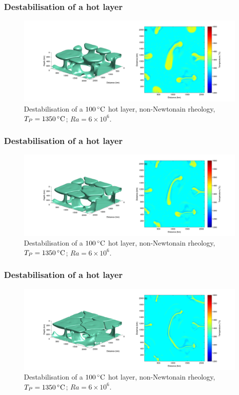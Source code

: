 \documentclass[aspectratio=169]{beamer}
\begin{document}
\begin{frame}
    \frametitle{Destabilisation of a hot layer}
    \begin{figure}
        \vspace{-.5cm}
        \includegraphics[width=0.85\paperwidth]{./figures/100hot/100hotbase_5.png}
        \caption{Destabilisation of a $100\rm\,^{\circ}C$ hot layer, non-Newtonain rheology, $T_{P}=1350\rm\,^{\circ}C$; $Ra = 6\times10^{6}$.}
    \end{figure}
\end{frame}

\begin{frame}
    \frametitle{Destabilisation of a hot layer}
    \begin{figure}
        \vspace{-.5cm}
        \includegraphics[width=0.85\paperwidth]{./figures/100hot/100hotbase_6.png}
        \caption{Destabilisation of a $100\rm\,^{\circ}C$ hot layer, non-Newtonain rheology, $T_{P}=1350\rm\,^{\circ}C$; $Ra = 6\times10^{6}$.}
    \end{figure}
\end{frame}

\begin{frame}
    \frametitle{Destabilisation of a hot layer}
    \begin{figure}
        \vspace{-.5cm}
        \includegraphics[width=0.85\paperwidth]{./figures/100hot/100hotbase_7.png}
        \caption{Destabilisation of a $100\rm\,^{\circ}C$ hot layer, non-Newtonain rheology, $T_{P}=1350\rm\,^{\circ}C$; $Ra = 6\times10^{6}$.}
    \end{figure}
\end{frame}
\end{document}
